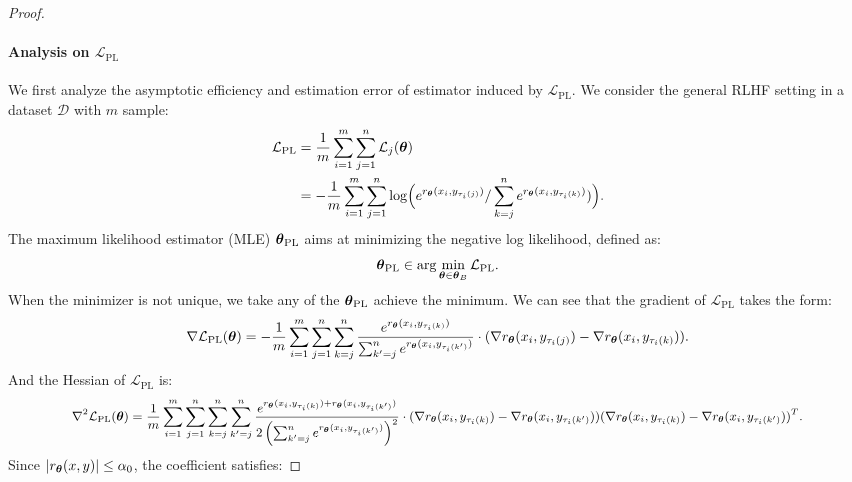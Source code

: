 \begin{proof}
\paragraph{Analysis on $\mathcal{L}_{\text{PL}}$}
We first analyze the asymptotic efficiency and estimation error of estimator induced by $\mathcal{L}_{\text{PL}}$.
We consider the general RLHF setting in a dataset $\mathcal{D}$ with $m$ sample: 
\begin{equation*}
\begin{aligned}
\mathcal{L}_{\text{PL}}&=\frac{1}{m}\sum\limits^{m}_{i=1}\sum\limits^{n}_{j=1}\mathcal{L}_{j}({\boldsymbol{\theta}}) \\
&=-\frac{1}{m}\sum\limits^{m}_{i=1}\sum\limits^{n}_{j=1}\log\!\Big({e^{r_{{\boldsymbol{\theta}}} (x_{i},y_{\tau_{i}(j)})} / \sum\limits_{k=j}^{n}e^{r_{{\boldsymbol{\theta}}} (x_{i},y_{\tau_{i}(k)})})}\Big).
\end{aligned}
\end{equation*}
The maximum likelihood estimator (MLE) $\boldsymbol{\theta}_{\text{\text{PL}}}$ aims at minimizing the negative log likelihood, defined as: 
\begin{equation*}
\boldsymbol{\theta}_{\text{\text{PL}}} \in \arg\min\limits_{{\boldsymbol{\theta}}\in{\boldsymbol{\theta}}_{B}}\mathcal{L}_{\text{PL}}.
\end{equation*}
When the minimizer is not unique, we take any of the $\boldsymbol{\theta}_{\text{\text{PL}}}$ achieve the minimum.
We can see that the gradient of $\mathcal{L}_{\text{PL}}$ takes the form:
\begin{equation*}
    \nabla \mathcal{L}_{\text{PL}}({\boldsymbol{\theta}})= -\frac{1}{m}\sum_{i=1}^{m}\sum_{j=1}^{n}\sum_{k=j}^{n}\frac{e^{r_{{\boldsymbol{\theta}}} (x_{i},y_{\tau_{i}(k)})}}{\sum_{k'=j}^{n}e^{r_{{\boldsymbol{\theta}}} (x_{i},y_{\tau_{i}(k')})}}\cdot(\nabla r_{{\boldsymbol{\theta}}}(x_{i},y_{\tau_{i}(j)})-\nabla r_{{\boldsymbol{\theta}}}(x_{i},y_{\tau_{i}(k)})).
\end{equation*}
And the Hessian of $\mathcal{L}_{\text{PL}}$ is:
\begin{equation*}
\fontsize{9}{3}\selectfont{
\begin{aligned}
\nabla^{2} \mathcal{L}_{\text{PL}}(\wm)=\frac{1}{m}\sum_{i=1}^{m}\sum_{j=1}^{n}\sum_{k=j}^{n}\sum_{k'=j}^{n}\frac{e^{r_{\wm}(x_{i},y_{\tau_{i}(k)})+r_{\wm} (x_{i},y_{\tau_{i}(k')})}}{2\left(\sum_{k'=j}^{n}e^{r_{\wm} (x_{i},y_{\tau_{i}(k')})}\right)^{2}}\cdot(\nabla r_{\wm}(x_{i},y_{\tau_{i}(k)})-\nabla r_{\wm}(x_{i},y_{\tau_{i}(k')}))(\nabla r_{\wm}(x_{i},y_{\tau_{i}(k)})-\nabla r_{\wm}(x_{i},y_{\tau_{i}(k')}))^{T}.
\end{aligned}}
\end{equation*}
Since $|r_{{\boldsymbol{\theta}}}(x,y)|\leq \alpha_{0}$, the coefficient satisfies:


\end{proof}
